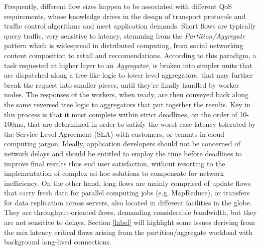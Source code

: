 Frequently, different flow sizes happen to be associated with different QoS requirements, whose knowledge drives in the design of transport protocols and traffic control algorithms and meet application demands. Short flows are typically query traffic, very sensitive to latency, stemming from the \textit{Partition/Aggregate} pattern which is widespread in distributed computing, from social networking content composition to retail and reccomendations. According to this paradigm, a task requested at higher layer to an \textit{Aggregator}, is broken into simpler units that are dispatched along a tree-like logic to lower level aggregators, that may further break the request into smaller pieces, until they're finally handled by worker nodes. The responses of the workers, when ready, are then conveyed back along the same reversed tree logic to aggregators that put together the results. Key in this process is that it must complete within strict deadlines, on the order of 10-100ms, that are determined in order to satisfy the worst-case latency tolerated by the Service Level Agreement (SLA) with customers, or tenants in cloud computing jargon. Ideally, application developers should not be concerned of network delays and should be entitled to employ the time before deadlines to improve final results thus end user satisfaction, without resorting to the implementation of complex ad-hoc solutions to compensate for network inefficiency. 
On the other hand, long flows are mainly comprised of update flows that carry fresh data for parallel computing jobs (e.g. MapReduce), or transfers for data replication across servers, also located in different facilities in the globe. They are throughput-oriented flows, demanding considerable bandwidth, but they are not sensitive to delays. Section \ref{label} will highlight some issues deriving from the mix latency critical  flows arising from the partition/aggregate workload with background long-lived connections.

